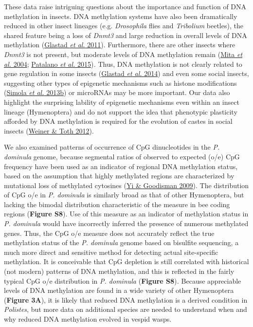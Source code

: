 \documentclass[]{article}
\begin{document}
These data raise intriguing questions about the importance and function
of DNA methylation in insects. DNA methylation systems have also been
dramatically reduced in other insect lineages (e.g. \emph{Drosophila}
flies and \emph{Tribolium} beetles), the shared feature being a loss of
\emph{Dnmt3} and large reduction in overall levels of DNA methylation
(\protect\hyperlink{ux5fENREFux5f13}{Glastad \emph{et al.} 2011}).
Furthermore, there are other insects where \emph{Dnmt3} is not present,
but moderate levels of DNA methylation remain
(\protect\hyperlink{ux5fENREFux5f36}{Mita \emph{et al.} 2004};
\protect\hyperlink{ux5fENREFux5f43}{Patalano \emph{et al.}
2015})\emph{.} Thus, DNA methylation is not clearly related to gene
regulation in some insects (\protect\hyperlink{ux5fENREFux5f12}{Glastad
\emph{et al.} 2014}) and even some social insects, suggesting other
types of epigenetic mechanisms such as histone modifications
(\protect\hyperlink{ux5fENREFux5f53}{Simola \emph{et al.} 2013b}) or
microRNAs may be more important. Our data also highlight the surprising
lability of epigenetic mechanisms even within an insect lineage
(Hymenoptera) and do not support the idea that phenotypic plasticity
afforded by DNA methylation is required for the evolution of castes in
social insects (\protect\hyperlink{ux5fENREFux5f68}{Weiner \& Toth
2012}).

We also examined patterns of occurrence of CpG dinucleotides in the
\emph{P. dominula} genome, because segmental ratios of observed to
expected (o/e) CpG frequency have been used as an indicator of regional
DNA methylation status, based on the assumption that highly methylated
regions are characterized by mutational loss of methylated cytosines
(\protect\hyperlink{ux5fENREFux5f76}{Yi \& Goodisman 2009}). The
distribution of CpG o/e in \emph{P. dominula} is similarly broad as that
of other Hymenoptera, but lacking the bimodal distribution
characteristic of the measure in bee coding regions (\textbf{Figure
S8}). Use of this measure as an indicator of methylation status in
\emph{P. dominula} would have incorrectly inferred the presence of
numerous methylated genes. Thus, the CpG o/e measure does not accurately
reflect the true methylation status of the \emph{P. dominula} genome
based on bisulfite sequencing, a much more direct and sensitive method
for detecting actual site-specific methylation. It is conceivable that
CpG depletion is still correlated with historical (not modern) patterns
of DNA methylation, and this is reflected in the fairly typical CpG o/e
distribution in \emph{P. dominula} (\textbf{Figure S8})\emph{.} Because
appreciable levels of DNA methylation are found in a wide variety of
other Hymenoptera (\textbf{Figure 3A}), it is likely that reduced DNA
methylation is a derived condition in \emph{Polistes}, but more data on
additional species are needed to understand when and why reduced DNA
methylation evolved in vespid wasps.
\end{document}
